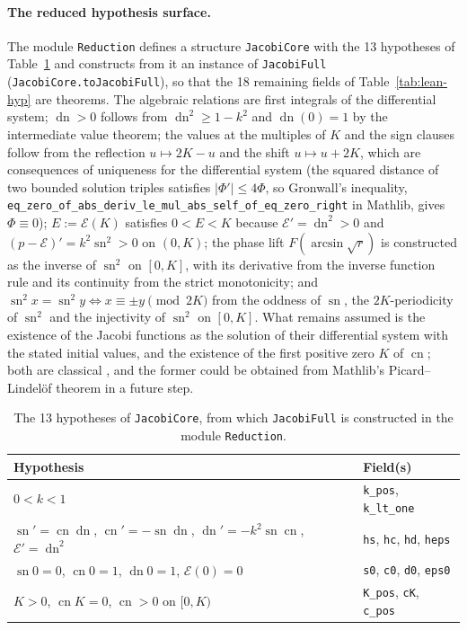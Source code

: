 \documentclass[11pt]{article}
\theoremstyle{remark}
\newcommand{\sn}{\operatorname{sn}}
\newcommand{\cn}{\operatorname{cn}}
\newcommand{\dn}{\operatorname{dn}}
\newcommand{\epsi}{\mathcal{E}}
\begin{document}
\paragraph{The reduced hypothesis surface.}
The module \texttt{Reduction} defines a structure \texttt{JacobiCore}
with the 13 hypotheses of Table~\ref{tab:lean-core} and constructs from
it an instance of \texttt{JacobiFull} (\texttt{JacobiCore.toJacobiFull}),
so that the 18 remaining fields of Table~\ref{tab:lean-hyp} are theorems.
The algebraic relations are first integrals of the differential system;
$\dn>0$ follows from $\dn^2\ge1-k^2$ and $\dn(0)=1$ by the intermediate
value theorem; the values at the multiples of $K$ and the sign clauses
follow from the reflection $u\mapsto2K-u$ and the shift $u\mapsto u+2K$,
which are consequences of uniqueness for the differential system
(the squared distance of two bounded solution triples satisfies
$|\Phi'|\le4\Phi$, so Gronwall's inequality,
\texttt{eq\_zero\_of\_abs\_deriv\_le\_mul\_abs\_self\_of\_eq\_zero\_right}
in Mathlib, gives $\Phi\equiv0$); $E:=\epsi(K)$ satisfies $0<E<K$ because
$\epsi'=\dn^2>0$ and $(p-\epsi)'=k^2\sn^2>0$ on $(0,K)$; the phase lift
$F(\arcsin\sqrt r)$ is constructed as the inverse of $\sn^2$ on $[0,K]$,
with its derivative from the inverse function rule and its continuity from
the strict monotonicity; and $\sn^2x=\sn^2y\iff x\equiv\pm y\pmod{2K}$ from
the oddness of $\sn$, the $2K$-periodicity of $\sn^2$ and the injectivity
of $\sn^2$ on $[0,K]$.  What remains assumed is the existence of the
Jacobi functions as the solution of their differential system with the
stated initial values, and the existence of the first positive zero $K$
of $\cn$; both are classical \cite[\S22.13, \S22.4]{DLMF}, and the former
could be obtained from Mathlib's Picard--Lindel\"of theorem in a future
step.

\begin{table}[H]
\small\centering
\caption{The 13 hypotheses of \texttt{JacobiCore}, from which
\texttt{JacobiFull} is constructed in the module \texttt{Reduction}.}
\label{tab:lean-core}
\begin{tabular}{>{\raggedright\arraybackslash}p{}>{\raggedright\arraybackslash}p{}}
\hline
Hypothesis & Field(s)\\
\hline
$0<k<1$ & \texttt{k\_pos}, \texttt{k\_lt\_one}\\
$\sn'=\cn\dn$, $\cn'=-\sn\dn$, $\dn'=-k^2\sn\cn$, $\epsi'=\dn^2$ & \texttt{hs}, \texttt{hc}, \texttt{hd}, \texttt{heps}\\
$\sn0=0$, $\cn0=1$, $\dn0=1$, $\epsi(0)=0$ & \texttt{s0}, \texttt{c0}, \texttt{d0}, \texttt{eps0}\\
$K>0$, $\cn K=0$, $\cn>0$ on $[0,K)$ & \texttt{K\_pos}, \texttt{cK}, \texttt{c\_pos}\\
\hline
\end{tabular}
\end{table}
\end{document}
